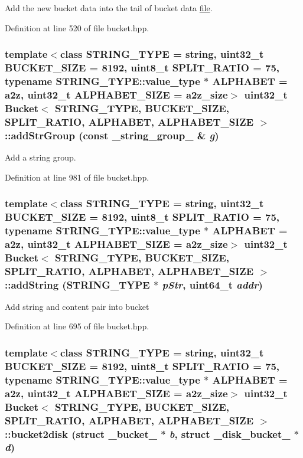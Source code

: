Add the new bucket data into the tail of bucket data \hyperlink{classfile}{file}. 

Definition at line 520 of file bucket.hpp.\hypertarget{classBucket_46d5394d7cef3979bafb66e9163179a1}{
\subsubsection[{addStrGroup}]{\setlength{\rightskip}{0pt plus 5cm}template$<$class STRING\_\-TYPE  = string, uint32\_\-t BUCKET\_\-SIZE = 8192, uint8\_\-t SPLIT\_\-RATIO = 75, typename STRING\_\-TYPE::value\_\-type $\ast$ ALPHABET = a2z, uint32\_\-t ALPHABET\_\-SIZE = a2z\_\-size$>$ uint32\_\-t {\bf Bucket}$<$ STRING\_\-TYPE, BUCKET\_\-SIZE, SPLIT\_\-RATIO, ALPHABET, ALPHABET\_\-SIZE $>$::addStrGroup (const \_\-string\_\-group\_\- \& {\em g})}}
\label{classBucket_46d5394d7cef3979bafb66e9163179a1}


Add a string group. 

Definition at line 981 of file bucket.hpp.\hypertarget{classBucket_dbd9d27161fe66c47cdd51913153b7b3}{
\subsubsection[{addString}]{\setlength{\rightskip}{0pt plus 5cm}template$<$class STRING\_\-TYPE  = string, uint32\_\-t BUCKET\_\-SIZE = 8192, uint8\_\-t SPLIT\_\-RATIO = 75, typename STRING\_\-TYPE::value\_\-type $\ast$ ALPHABET = a2z, uint32\_\-t ALPHABET\_\-SIZE = a2z\_\-size$>$ uint32\_\-t {\bf Bucket}$<$ STRING\_\-TYPE, BUCKET\_\-SIZE, SPLIT\_\-RATIO, ALPHABET, ALPHABET\_\-SIZE $>$::addString (STRING\_\-TYPE $\ast$ {\em pStr}, \/  uint64\_\-t {\em addr})}}
\label{classBucket_dbd9d27161fe66c47cdd51913153b7b3}


Add string and content pair into bucket 

Definition at line 695 of file bucket.hpp.\hypertarget{classBucket_bf1cc5a3b92c5c12c15567267eee7d6a}{
\subsubsection[{bucket2disk}]{\setlength{\rightskip}{0pt plus 5cm}template$<$class STRING\_\-TYPE  = string, uint32\_\-t BUCKET\_\-SIZE = 8192, uint8\_\-t SPLIT\_\-RATIO = 75, typename STRING\_\-TYPE::value\_\-type $\ast$ ALPHABET = a2z, uint32\_\-t ALPHABET\_\-SIZE = a2z\_\-size$>$ uint32\_\-t {\bf Bucket}$<$ STRING\_\-TYPE, BUCKET\_\-SIZE, SPLIT\_\-RATIO, ALPHABET, ALPHABET\_\-SIZE $>$::bucket2disk (struct \_\-bucket\_\- $\ast$ {\em b}, \/  struct \_\-disk\_\-bucket\_\- $\ast$ {\em d})}}
\label{classBucket_bf1cc5a3b92c5c12c15567267eee7d6a}


